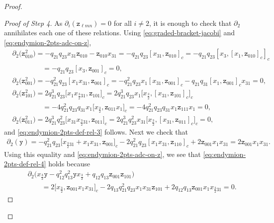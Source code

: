 \documentclass[10pt,a4paper]{amsart}
\numberwithin{equation}{section}
\newcommand{\yt}{\mathtt{y}}
\newcommand{\zt}{\mathtt{z}}
\newcommand{\tresdos}{\frac{3}{2}}
\begin{document}
\begin{proof}
\begin{proof}[Proof of Step 4]
As $\partial_i(\zt_{\ell mn})=0$ for all $i\ne 2$, it is enough to check that $\partial_2$ annihilates each one of these relations. Using \eqref{eq:graded-bracket-jacobi} and \eqref{eq:endymion-2pts-adc-on-z},
\begin{align*}
&\partial_2 \big(\zt_{010}^2\big) = -q_{21}q_{23}x_{31}\zt_{010}-\zt_{010}x_{31}
= -q_{21}q_{23}[x_{31}, \zt_{010}]_c
= -q_{21}q_{23}[x_{3}, [x_1,\zt_{010}]_c]_c
\\ &\phantom{\partial_2 (\zt_{010}^2)}
= -q_{21}q_{23}[x_{3}, \zt_{001}]_c =0,
\\
&\partial_2 \big(\zt_{001}^2\big) = -q_{21}^2q_{23}[x_1x_{31}, \zt_{001}]_c
=-q_{21}^2q_{23}x_1[x_{31}, \zt_{001}]_c-q_{21}q_{31}[x_1, \zt_{001}]_cx_{31}=0,
\\
&\partial_2 \big(\zt_{101}^2\big) = 2q_{21}^3q_{23}\big[x_1x_{\tresdos31}, \zt_{101}\big]_c
= 2q_{21}^3q_{23}x_1\big[x_{\tresdos}, [x_{31},\zt_{101}]_c\big]_c
\\&\phantom{\partial_2 (\zt_{101}^2)}
=-4q_{21}^2q_{23}q_{31} x_1\big[x_{\tresdos}, \zt_{011}x_1\big]_c=-4q_{21}^2q_{23}q_{31} x_1\zt_{111}x_1=0,
\\
&\partial_2 \big(\zt_{011}^2\big) = 2q_{21}^3q_{23}^2\big[x_{31}x_{\tresdos31}, \zt_{011}\big]_c
= 2q_{21}^3q_{23}^2x_{31}\big[x_{\tresdos}, [x_{31},\zt_{011}]_c\big]_c=0,
\end{align*}
and \eqref{eq:endymion-2pts-def-rel-3} follows. Next we check that
\begin{align*}
\partial_2 (\yt) = -q_{21}^2q_{23} \big[x_{\tresdos31}+x_1x_{31},\zt_{001}\big]_c-2q_{21}^2q_{23} [x_1x_{31},\zt_{110}]_c+2\zt_{001}x_1x_{31}
 =2\zt_{001}x_1x_{31}.
\end{align*}
Using this equality and \eqref{eq:endymion-2pts-adc-on-z}, we see that \eqref{eq:endymion-2pts-def-rel-4} holds because
\begin{align*}
&\partial_{2} \big(x_{\tresdos}\yt -q_{12}^2q_{13}^2\yt x_{\tresdos}+q_{12}q_{13}\zt_{001}\zt_{101}\big)
\\
&\qquad{}= 2\big[x_{\tresdos}, \zt_{001}x_1x_{31}\big]_c
-2q_{13}q_{21}^2q_{23}x_1x_{31}\zt_{101}+2q_{12}q_{13}\zt_{001} x_1x_{\tresdos31}=0.\tag*{\qed}
\end{align*}
\renewcommand{\qed}{}
\end{proof}




\end{proof}
\end{document}
